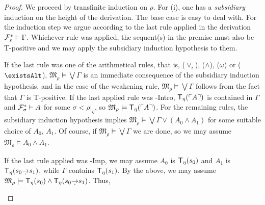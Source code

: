 \documentclass[UKenglish,cleveref,DIV=12]{scrartcl}
\let\exists\existsAlt
\theoremstyle{definition}
\theoremstyle{definition}
\begin{document}
\begin{proof}
We proceed by transfinite induction on $\rho$. For (i), one has a {\em
subsidiary} induction on the height of the derivation. The base case is easy to
deal with. For the induction step we argue according to the last rule applied in
the derivation $\mathcal{F}^*_\rho\vdash\Gamma$. Whichever rule was applied, the sequent(s) in the premise must also be T-positive and we may apply the subsidiary induction hypothesis to them.

If the last rule was one of the arithmetical rules, that is, ($\lor_i$),
($\land$), ($\omega$) or ($\exists$),
$\mathfrak{M}_\rho\models\bigvee\Gamma$ is an immediate consequence of the
subsidiary induction hypothesis, and in the case of the weakening rule,
$\mathfrak{M}_\rho\models\bigvee\Gamma$ follows from the fact that $\Gamma$ is
T-positive. If the last applied rule was \textT\eta-Intro, $\mathsf{T}_\eta(\ulcorner{A}\urcorner)$ is
contained in $\Gamma$ and $\mathcal{F}^*_\sigma\vdash A$ for some %
$\sigma<\rho|_\eta$, so $\mathfrak{M}_\rho\models \mathsf{T}_\eta(\ulcorner{A}\urcorner)$.
For the remaining rules, the subsidiary induction hypothesis implies
$\mathfrak{M}_\rho\models\bigvee\Gamma\lor(A_0\land A_1)$ for some suitable
choice of $A_0$, $A_1$.
Of course, if
$\mathfrak{M}_\rho\models\bigvee\Gamma$ we are done, so we may assume
$\mathfrak{M}_\rho\models A_0\land A_1$.
\begin{description}\renewcommand*\labelitemi{--}%
\item [\normalfont{}\textT\eta-Imp.] If the last rule applied was \textT\eta-Imp, we may
  assume $A_0$ is $\mathsf{T}_\eta(s_0)$ and $A_1$ is $\T_\eta(s_0\dimplies s_1)$, while
  $\Gamma$ contains $\mathsf{T}_\eta(s_1)$. By the above, we may assume
  $\mathfrak{M}_\rho\models \T_\eta(s_0)\land \T_\eta(s_0\dimplies s_1)$. Thus,

\end{description}
\end{proof}
\end{document}
